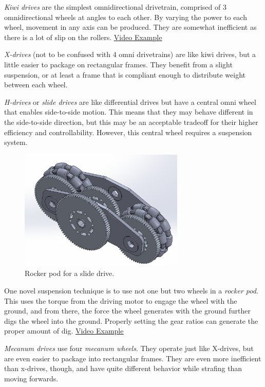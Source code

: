 \begin{asparaenum}[a)]
	\item \textit{Kiwi drives} are the simplest omnidirectional drivetrain, comprised of 3 omnidirectional wheels at angles to each other. By varying the power to each wheel, movement in any axis can be produced. They are somewhat inefficient as there is a lot of slip on the rollers. \href{https://www.youtube.com/watch?v=GTRMEl4-ePc}{\color{red}\underline{Video Example}}
	\item \textit{X-drives} (not to be confused with 4 omni drivetrains) are like kiwi drives, but a little easier to package on rectangular frames. They benefit from a slight suspension, or at least a frame that is compliant enough to distribute weight between each wheel.
	\item \textit{H-drives} or \textit{slide drives} are like differential drives but have a central omni wheel that enables side-to-side motion. This means that they may behave different in the side-to-side direction, but this may be an acceptable tradeoff for their higher efficiency and controllability. However, this central wheel requires a suspension system.
	\begin{figure}[H]
		\includegraphics[width=0.7\textwidth]{imgs/drivetrain_slide_rocker.png}
		\caption{Rocker pod for a slide drive.}
	\end{figure}
	One novel suspension technique is to use not one but two wheels in a \textit{rocker pod}. This uses the torque from the driving motor to engage the wheel with the ground, and from there, the force the wheel generates with the ground further digs the wheel into the ground. Properly setting the gear ratios can generate the proper amount of dig. \href{https://www.youtube.com/watch?v=YBUEhrsC9Es}{\color{red}\underline{Video Example}}
	\item \textit{Mecanum drives} use four \textit{mecanum wheels}. They operate just like X-drives, but are even easier to package into rectangular frames. They are even more inefficient than x-drives, though, and have quite different behavior while strafing than moving forwards.
\end{asparaenum}

